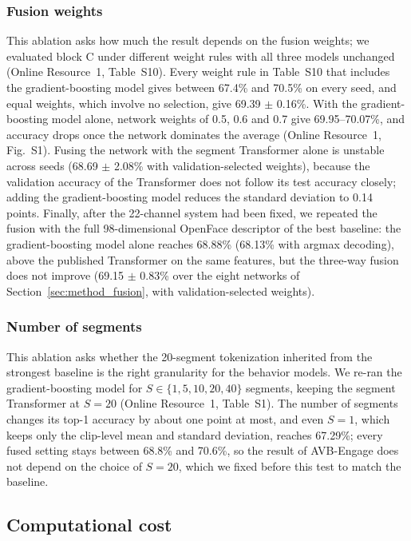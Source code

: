 \documentclass[pdflatex,iicol,sn-basic]{sn-jnl}
\newcommand{\ournet}{AVB-Engage}
\begin{document}
\subsubsection{Fusion weights}\label{sec:abl_fusion}

This ablation asks how much the result depends on the fusion weights; we evaluated block C under different weight rules with all three models unchanged (Online Resource~1, Table~S10). Every weight rule in Table~S10 that includes the gradient-boosting model gives between 67.4\% and 70.5\% on every seed, and equal weights, which involve no selection, give 69.39 $\pm$ 0.16\%. With the gradient-boosting model alone, network weights of 0.5, 0.6 and 0.7 give 69.95--70.07\%, and accuracy drops once the network dominates the average (Online Resource~1, Fig.~S1). Fusing the network with the segment Transformer alone is unstable across seeds (68.69 $\pm$ 2.08\% with validation-selected weights), because the validation accuracy of the Transformer does not follow its test accuracy closely; adding the gradient-boosting model reduces the standard deviation to 0.14 points. Finally, after the 22-channel system had been fixed, we repeated the fusion with the full 98-dimensional OpenFace descriptor of the best baseline: the gradient-boosting model alone reaches 68.88\% (68.13\% with argmax decoding), above the published Transformer on the same features, but the three-way fusion does not improve (69.15 $\pm$ 0.83\% over the eight networks of Section~\ref{sec:method_fusion}, with validation-selected weights).


\subsubsection{Number of segments}\label{sec:abl_segments}

This ablation asks whether the 20-segment tokenization inherited from the strongest baseline is the right granularity for the behavior models. We re-ran the gradient-boosting model for $S \in \{1, 5, 10, 20, 40\}$ segments, keeping the segment Transformer at $S = 20$ (Online Resource~1, Table~S1). The number of segments changes its top-1 accuracy by about one point at most, and even $S = 1$, which keeps only the clip-level mean and standard deviation, reaches 67.29\%; every fused setting stays between 68.8\% and 70.6\%, so the result of \ournet{} does not depend on the choice of $S = 20$, which we fixed before this test to match the baseline.

\subsection{Computational cost}\label{sec:res_cost}
\end{document}
